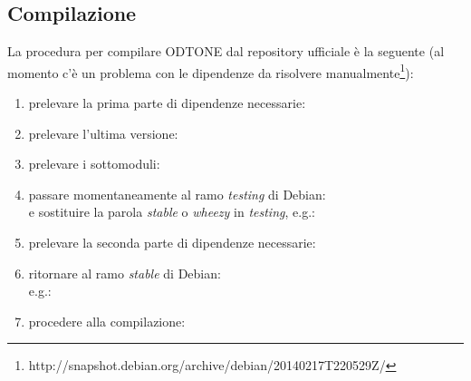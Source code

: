 \subsection{Compilazione}
La procedura per compilare ODTONE dal repository ufficiale è la seguente (al momento c'è un problema con le dipendenze da risolvere manualmente\footnote{http://snapshot.debian.org/archive/debian/20140217T220529Z/}):
\begin{enumerate}

\item prelevare la prima parte di dipendenze necessarie:\\

\item prelevare l'ultima versione:\\

\item prelevare i sottomoduli:\\

\item passare momentaneamente al ramo {\em testing} di Debian:\\
e sostituire la parola {\em stable} o {\em wheezy} in {\em testing}, e.g.:\\

\item prelevare la seconda parte di dipendenze necessarie:\\

\item ritornare al ramo {\em stable} di Debian:\\
e.g.:\\

\item procedere alla compilazione:\\

\end{enumerate}

